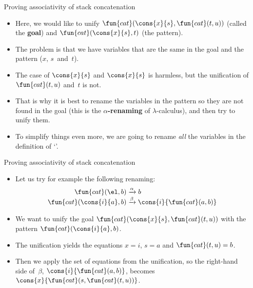 %
\begin{frame}{Proving associativity of stack concatenation}

  \begin{itemize}

    \item Here, we would like to unify
      \(\fun{cat}(\cons{x}{s},\fun{cat}(t,u))\) (called the
      \textbf{goal}) and \(\fun{cat}(\cons{x}{s},t)\) (the pattern).

    \item The problem is that we have variables that are the same in
      the goal and the pattern (\(x\), \(s\)~and~\(t\)).

    \item The case of \(\cons{x}{s}\) and \(\cons{x}{s}\) is harmless,
      but the unification of \(\fun{cat}(t,u)\) and~\(t\) is not.

    \item That is why it is best to rename the variables in the
      pattern so they are not found in the goal (this is the
      \textbf{\(\alpha\)\hyp{}renaming} of \(\lambda\)\hyp{}calculus),
      and then try to unify them.

    \item To simplify things even more, we are going to rename
      \emph{all} the variables in the definition of `'.

  \end{itemize}

\end{frame}

%
\begin{frame}{Proving associativity of stack concatenation}

  \begin{itemize}

    \item Let us try for example the following renaming:
      \begin{align*}
        \fun{cat}(        \el,b) &\xrightarrow{\alpha} b\\
        \fun{cat}(\cons{i}{a},b) &\xrightarrow{\smash{\beta}}
        \cons{i}{\fun{cat}(a,b)}
      \end{align*}

    \item We want to unify the goal
      \(\fun{cat}(\cons{x}{s},\fun{cat}(t,u))\) with the pattern
      \(\fun{cat}(\cons{i}{a},b)\).

    \item The unification yields the equations \(x = i\), \(s = a\)
      and \(\fun{cat}(t,u) = b\).

    \item Then we apply the set of equations from the unification, so
      the right\hyp{}hand side of~\(\beta\),
      \(\cons{i}{\fun{cat}(a,b)}\), becomes
      \(\cons{x}{\fun{cat}(s,\fun{cat}(t,u))}\).

  \end{itemize}

\end{frame}


